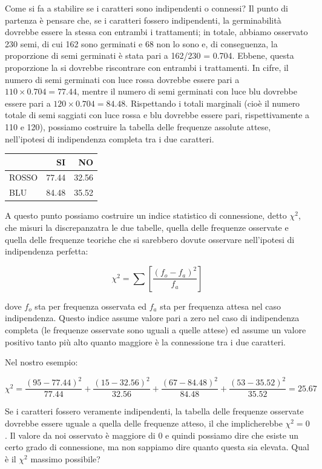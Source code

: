 \documentclass[a4paper,12pt,oneside]{book}
\begin{document}
Come si fa a stabilire se i caratteri sono indipendenti o connessi? Il punto di partenza è pensare che, se i caratteri fossero indipendenti, la germinabilità dovrebbe essere la stessa con entrambi i trattamenti; in totale, abbiamo osservato 230 semi, di cui 162 sono germinati e 68 non lo sono e, di conseguenza, la proporzione di semi germinati è stata pari a 162/230 = 0.704. Ebbene, questa proporzione la si dovrebbe riscontrare con entrambi i trattamenti. In cifre, il numero di semi germinati con luce rossa dovrebbe essere pari a \(110 \times 0.704 = 77.44\), mentre il numero di semi germinati con luce blu dovrebbe essere pari a \(120 \times 0.704 = 84.48\). Rispettando i totali marginali (cioè il numero totale di semi saggiati con luce rossa e blu dovrebbe essere pari, rispettivamente a 110 e 120), possiamo costruire la tabella delle frequenze assolute attese, nell'ipotesi di indipendenza completa tra i due caratteri.

\begin{tabular}{l|r|r}
\hline
  & SI & NO\\
\hline
ROSSO & 77.44 & 32.56\\
\hline
BLU & 84.48 & 35.52\\
\hline
\end{tabular}

A questo punto possiamo costruire un indice statistico di connessione, detto \(\chi^2\), che misuri la discrepanzatra le due tabelle, quella delle frequenze osservate e quella delle frequenze teoriche che si sarebbero dovute osservare nell'ipotesi di indipendenza perfetta:

\[\chi ^2  = \sum \left[ \frac{\left( {f_o  - f_a } \right)^2 }{f_a } \right]\]

dove \(f_o\) sta per frequenza osservata ed \(f_a\) sta per frequenza attesa nel caso indipendenza. Questo indice assume valore pari a zero nel caso di indipendenza completa (le frequenze osservate sono uguali a quelle attese) ed assume un valore positivo tanto più alto quanto maggiore è la connessione tra i due caratteri.

Nel nostro esempio:

\[\chi^2  = \frac{\left( {95  - 77.44 } \right)^2 }{77.44 } + \frac{\left( {15  - 32.56 } \right)^2 }{32.56 } + \frac{\left( {67  - 84.48 } \right)^2 }{84.48 } + \frac{\left( {53  - 35.52 } \right)^2 }{35.52 } = 25.67\]

Se i caratteri fossero veramente indipendenti, la tabella delle frequenze osservate dovrebbe essere uguale a quella delle frequenze atteso, il che implicherebbe \(\chi^2 = 0\). Il valore da noi osservato è maggiore di 0 e quindi possiamo dire che esiste un certo grado di connessione, ma non sappiamo dire quanto questa sia elevata. Qual è il \(\chi^2\) massimo possibile?
\end{document}
